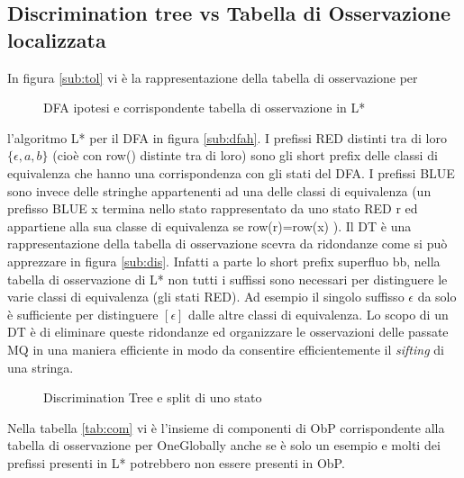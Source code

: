 \subsection{Discrimination tree vs Tabella di Osservazione localizzata}
 In figura \ref{sub:tol} vi è la rappresentazione della tabella di osservazione per
 \begin{figure}[htp]
\centering
{} \quad
{}
\caption{DFA ipotesi e corrispondente tabella di osservazione in L*}
\label{fig:dfal}
\end{figure} 
l'algoritmo L* per il \ac{DFA} in figura \ref{sub:dfah}. I prefissi RED distinti tra di loro $\{\epsilon,a,b\}$ (cioè con row() distinte tra di loro) sono gli short prefix delle classi di equivalenza che hanno una corrispondenza con gli stati del \ac{DFA}. I prefissi BLUE sono invece delle stringhe appartenenti ad una delle classi di equivalenza (un prefisso BLUE x termina nello stato rappresentato da uno stato RED r ed appartiene alla sua classe di equivalenza se row(r)=row(x) ). Il \ac{DT} è una rappresentazione della tabella di osservazione scevra da ridondanze come si può apprezzare in figura \ref{sub:dis}. Infatti a parte lo short prefix superfluo bb,  nella tabella di osservazione di L* non tutti i suffissi sono necessari per distinguere le varie classi di equivalenza (gli stati RED). Ad esempio il singolo suffisso  $\epsilon$ da solo è sufficiente per distinguere $[\epsilon]$ dalle altre classi di equivalenza. Lo scopo di un \ac{DT} è di eliminare queste ridondanze ed organizzare le osservazioni delle passate \ac{MQ} in una maniera efficiente in modo da consentire efficientemente il \textit{sifting} di una stringa.
 \begin{figure}[htp]
\centering
{} \quad
{}
\caption{Discrimination Tree e split di uno stato}
\label{fig:diss}
\end{figure} 
Nella tabella \ref{tab:com} vi è l'insieme di componenti di \ac{ObP} corrispondente alla tabella di osservazione per OneGlobally anche se è solo un esempio e molti dei prefissi presenti in L* potrebbero non essere presenti in \ac{ObP}. 
